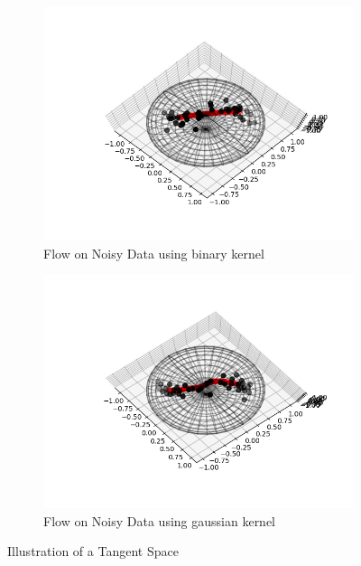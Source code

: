 \documentclass[12pt]{report}
\begin{document}
\begin{figure}[h]
\centering
\begin{subfigure}{.5\textwidth}
    \centering
    \includegraphics[scale=0.5]{noisy_13.png}
    \caption{Flow on Noisy Data using binary kernel}
    \label{noisybinary}
\end{subfigure}%
\begin{subfigure}{.5\textwidth}
    \centering
    \includegraphics[scale=0.5]{noisy_13_gaussian.png}
    \caption{Flow on Noisy Data using gaussian kernel}
    \label{noisygaussian}
\end{subfigure}
\caption{Illustration of a Tangent Space}
\label{fig:test}
\end{figure}
\end{document}

